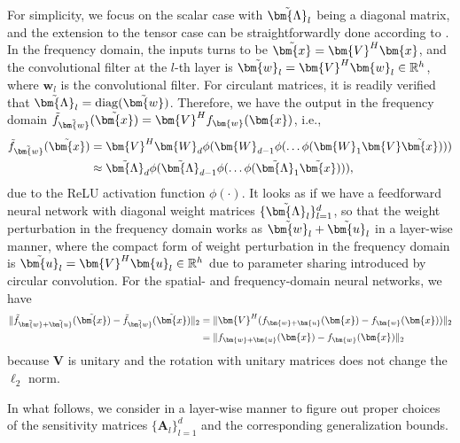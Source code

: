 \documentclass[journal]{IEEEtran} %
\def\vu{{\bm{u}}}
\def\vw{{\bm{w}}}
\def\vx{{\bm{x}}}
\def\mA{{\bm{A}}}
\def\mV{{\bm{V}}}
\def\mW{{\bm{W}}}
\def\mLambda{{\bm{\Lambda}}}
\newcommand{\R}{\mathbb{R}}
\newcommand{\Norm}[1]{\|#1\|}
\begin{document}
For simplicity, we focus on the scalar case with $\Tilde{\mLambda}_l$ being a diagonal matrix, and the extension to the tensor case can be straightforwardly done according to \cite{yi2022asymptotic}. 
In the frequency domain, the inputs turns to be $\Tilde{\vx}=\mV^H \vx$, and the convolutional filter at the $l$-th layer is $\Tilde{\vw}_l=\mV^H \vw_l \in \R^h$, where $\vw_l$ is the convolutional filter. For circulant matrices, it is readily verified that $\Tilde{\mLambda}_l=\mathrm{diag}(\Tilde{\vw})$. Therefore, we have the output in the frequency domain $\Tilde{f}_{\Tilde{\vw}}(\Tilde{\vx}) = \mV^H f_{\vw}(\vx)$, i.e.,
\begin{align}
    \Tilde{f}_{\Tilde{\vw}}(\Tilde{\vx}) & = \mV^H \mW_d \phi(\mW_{d-1}\phi(\dots \phi(\mW_1 \mV\Tilde{\vx})))\\
    &\approx \Tilde{\mLambda}_d \phi(\Tilde{\mLambda}_{d-1}\phi(\dots \phi(\Tilde{\mLambda}_1 \Tilde{\vx}))),
\end{align}
due to the ReLU activation function $\phi(\cdot)$.
It looks as if we have a feedforward neural network with diagonal weight matrices $\{\Tilde{\mLambda}_l\}_{l=1}^d$, so that the weight perturbation in the frequency domain works as $\Tilde{\vw}_l+\Tilde{\vu}_l$ in a layer-wise manner, where the compact form of weight perturbation in the frequency domain is $\Tilde{\vu}_l = \mV^H \vu_l \in \R^{h}$ due to parameter sharing introduced by circular convolution. 
%
For the spatial- and frequency-domain neural networks, we have
\begin{align}
    \Norm{\Tilde{f}_{\Tilde{\vw}+\Tilde{\vu}}(\Tilde{\vx})-\Tilde{f}_{\Tilde{\vw}}(\Tilde{\vx})}_2 &= \Norm{\mV^H({f}_{\vw+\vu}({\vx})-{f}_{\vw}({\vx}))}_2 \\ &= \Norm{{f}_{\vw+\vu}({\vx})-{f}_{\vw}({\vx})}_2
\end{align}
because $\mV$ is unitary and the rotation with unitary matrices does not change the $\ell_2$ norm.

In what follows, we consider in a layer-wise manner to figure out proper choices of the sensitivity matrices $\{\mA_l\}_{l=1}^d$ and the corresponding generalization bounds.
\end{document}

